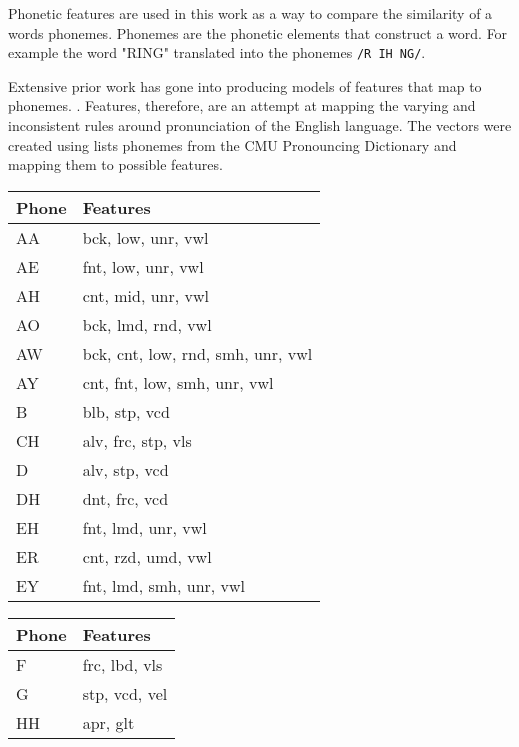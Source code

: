Phonetic features are used in this work as a way to compare the similarity of a words phonemes. Phonemes are the phonetic elements that construct a word. For example the word "RING" translated into the phonemes \verb|/R IH NG/|. 

Extensive prior work has gone into producing models of features that map to phonemes. \cite{chomsky1968sound}\cite{ladefoged1969measurement}\cite{bradlow2010perceptual}. Features, therefore, are an attempt at mapping the varying and inconsistent rules around pronunciation of the English language. The vectors were created using lists phonemes from the CMU Pronouncing Dictionary and mapping them to possible features.

\begin{table}[!htb]
    \tiny
    \begin{minipage}{.33\linewidth}
        \centering
        \begin{tabular}{ll}
            Phone & Features \\
            \hline
            AA & bck, low, unr, vwl \\
            AE & fnt, low, unr, vwl \\
            AH & cnt, mid, unr, vwl \\
            AO & bck, lmd, rnd, vwl \\
            AW & bck, cnt, low, rnd, smh, unr, vwl \\
            AY & cnt, fnt, low, smh, unr, vwl \\
            B & blb, stp, vcd \\
            CH & alv, frc, stp, vls \\
            D & alv, stp, vcd \\
            DH & dnt, frc, vcd \\
            EH & fnt, lmd, unr, vwl \\
            ER & cnt, rzd, umd, vwl \\
            EY & fnt, lmd, smh, unr, vwl
        \end{tabular}
    \end{minipage}%
    \begin{minipage}{.33\linewidth}
        \centering
        \begin{tabular}{ll}
            Phone & Features \\
            \hline
            F &  frc, lbd, vls \\
            G &  stp, vcd, vel \\
            HH & apr, glt \\

\end{tabular}
\end{minipage}
\end{table}
